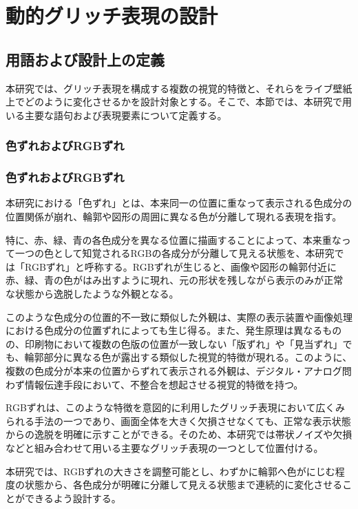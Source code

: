 \chapter{動的グリッチ表現の設計}


\section{用語および設計上の定義}

本研究では、グリッチ表現を構成する複数の視覚的特徴と、それらをライブ壁紙上でどのように変化させるかを設計対象とする。そこで、本節では、本研究で用いる主要な語句および表現要素について定義する。


\subsection{色ずれおよびRGBずれ}

\subsection{色ずれおよびRGBずれ}

本研究における「色ずれ」とは、本来同一の位置に重なって表示される色成分の位置関係が崩れ、輪郭や図形の周囲に異なる色が分離して現れる表現を指す。

特に、赤、緑、青の各色成分を異なる位置に描画することによって、本来重なって一つの色として知覚されるRGBの各成分が分離して見える状態を、本研究では「RGBずれ」と呼称する。RGBずれが生じると、画像や図形の輪郭付近に赤、緑、青の色がはみ出すように現れ、元の形状を残しながら表示のみが正常な状態から逸脱したような外観となる。

このような色成分の位置的不一致に類似した外観は、実際の表示装置や画像処理における色成分の位置ずれによっても生じ得る。また、発生原理は異なるものの、印刷物において複数の色版の位置が一致しない「版ずれ」や「見当ずれ」でも、輪郭部分に異なる色が露出する類似した視覚的特徴が現れる。このように、複数の色成分が本来の位置からずれて表示される外観は、デジタル・アナログ問わず情報伝達手段において、不整合を想起させる視覚的特徴を持つ。

RGBずれは、このような特徴を意図的に利用したグリッチ表現において広くみられる手法の一つであり、画面全体を大きく欠損させなくても、正常な表示状態からの逸脱を明確に示すことができる。そのため、本研究では帯状ノイズや欠損などと組み合わせて用いる主要なグリッチ表現の一つとして位置付ける。

本研究では、RGBずれの大きさを調整可能とし、わずかに輪郭へ色がにじむ程度の状態から、各色成分が明確に分離して見える状態まで連続的に変化させることができるよう設計する。

